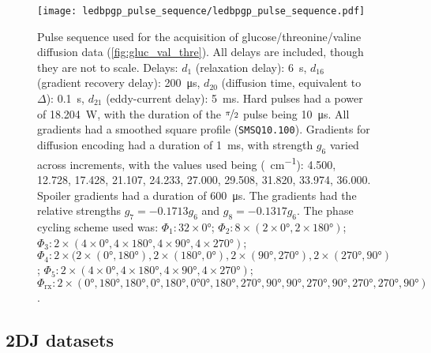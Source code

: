 \begin{figure}[H]
    \centering
    \texttt{[image: ledbpgp\_pulse\_sequence/ledbpgp\_pulse\_sequence.pdf]}
    \caption[
        Pulse sequence used for the acquisition of glucose/threonine/valine
        diffusion data.
    ]{
        Pulse sequence used for the acquisition of glucose/threonine/valine
        diffusion data (\cref{fig:gluc_val_thre}). All
        delays are included, though they are not to scale.
        Delays:
        $d_1$ (relaxation delay): \qty{6}{\second},
        $d_{16}$ (gradient recovery delay): \qty{200}{\micro\second},
        $d_{20}$ (diffusion time, equivalent to $\Delta$): \qty{0.1}{\second},
        $d_{21}$ (eddy-current delay): \qty{5}{\milli\second}.
        Hard pulses had a power of \qty{18.204}{\watt},
        with the duration of the $\nicefrac{\pi}{2}$ pulse being
        \qty{10}{\micro\second}.
        All gradients had a smoothed square profile
        (\texttt{SMSQ10.100}).
        Gradients for diffusion encoding had a duration of
        \qty{1}{\milli\second}, with strength $g_6$ varied across increments,
        with the values used being (\unit{\gauss \per \centi \meter}):
        4.500,
        12.728,
        17.428,
        21.107,
        24.233,
        27.000,
        29.508,
        31.820,
        33.974,
        36.000.
        Spoiler gradients had a duration of \qty{600}{\micro\second}. The
        gradients had the relative strengths $g_7=-0.1713g_6$ and
        $g_8=-0.1317g_6$.
        The phase cycling scheme used was:
        $\Phi_1: 32 \times \ang{0}$;
        $\Phi_2: 8 \times (2 \times \ang{0}, 2 \times \ang{180})$;
        $\Phi_3: 2 \times (4 \times \ang{0}, 4 \times \ang{180}, 4 \times \ang{90}, 4 \times \ang{270})$;
        $\Phi_4: 2 \times (2 \times (\ang{0}, \ang{180}), 2 \times (\ang{180}, \ang{0}), 2 \times (\ang{90}, \ang{270}), 2 \times (\ang{270}, \ang{90})$;
        $\Phi_5: 2 \times (4 \times \ang{0}, 4 \times \ang{180}, 4 \times \ang{90}, 4 \times \ang{270})$;
        $\Phi_{\text{rx}}: 2 \times (\ang{0}, \ang{180}, \ang{180}, \ang{0}, \ang{180}, \ang{0} \ang{0}, \ang{180},
        \ang{270}, \ang{90}, \ang{90}, \ang{270}, \ang{90}, \ang{270}, \ang{270}, \ang{90})$.
    }
    \label{fig:ledbpgp2s}
\end{figure}


\subsection{\acs{2DJ} datasets}
\label{subsec:cupid-experimental}

